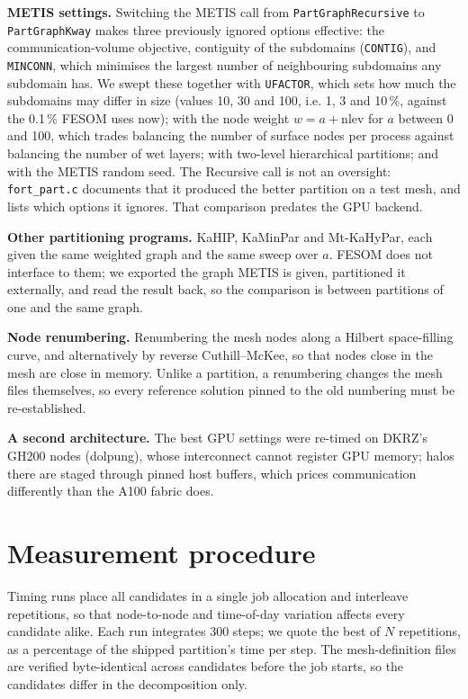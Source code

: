 \documentclass[11pt,a4paper]{article}
\newcommand{\minconn}{\texttt{MINCONN}}
\newcommand{\contig}{\texttt{CONTIG}}
\begin{document}
\textbf{METIS settings.} Switching the METIS call from \texttt{PartGraphRecursive} to
\texttt{PartGraphKway} makes three previously ignored options effective: the
communication-volume objective, contiguity of the subdomains (\contig), and \minconn, which
minimises the largest number of neighbouring subdomains any subdomain has. We swept these
together with \texttt{UFACTOR}, which sets how much the subdomains may differ in size (values
10, 30 and 100, i.e. 1, 3 and 10\,\%, against the 0.1\,\% FESOM uses now); with the node
weight $w = a + \mathrm{nlev}$ for $a$ between 0 and 100, which trades balancing the number of
surface nodes per process against balancing the number of wet layers; with two-level
hierarchical partitions; and with the METIS random seed. The Recursive call is not an
oversight: \texttt{fort\_part.c} documents that it produced the better partition on a test
mesh, and lists which options it ignores. That comparison predates the GPU backend.

\textbf{Other partitioning programs.} KaHIP, KaMinPar and Mt-KaHyPar, each given the same
weighted graph and the same sweep over $a$. FESOM does not interface to them; we exported the
graph METIS is given, partitioned it externally, and read the result back, so the comparison
is between partitions of one and the same graph.

\textbf{Node renumbering.} Renumbering the mesh nodes along a Hilbert space-filling curve, and
alternatively by reverse Cuthill--McKee, so that nodes close in the mesh are close in memory.
Unlike a partition, a renumbering changes the mesh files themselves, so every reference
solution pinned to the old numbering must be re-established.

\textbf{A second architecture.} The best GPU settings were re-timed on DKRZ's GH200 nodes
(dolpung), whose interconnect cannot register GPU memory; halos there are staged through pinned
host buffers, which prices communication differently than the A100 fabric does.

\section{Measurement procedure}

Timing runs place all candidates in a single job allocation and interleave repetitions, so that
node-to-node and time-of-day variation affects every candidate alike. Each run integrates 300
steps; we quote the best of $N$ repetitions, as a percentage of the shipped partition's time per
step. The mesh-definition files are verified byte-identical across candidates before the job
starts, so the candidates differ in the decomposition only.
\end{document}
